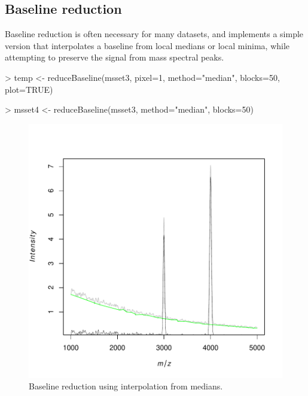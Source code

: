 \documentclass[a4paper]{article}
\begin{document}
\subsection{Baseline reduction}

Baseline reduction is often necessary for many datasets, and  implements a simple version that interpolates a baseline from local medians or local minima, while attempting to preserve the signal from mass spectral peaks.
\begin{Schunk}
\begin{Sinput}
> temp <- reduceBaseline(msset3, pixel=1, method="median", blocks=50, plot=TRUE)
\end{Sinput}
\end{Schunk}
\begin{Schunk}
\begin{Sinput}
> msset4 <- reduceBaseline(msset3, method="median", blocks=50)
\end{Sinput}
\end{Schunk}
\begin{figure}
\begin{center}
\includegraphics{Cardinal-demo-047}
\caption{\small Baseline reduction using interpolation from medians.}
\end{center}
\end{figure}
\end{document}
